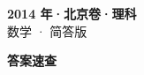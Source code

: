 \documentclass[zihao=-4, a4paper]{ctexart}
\begin{document}
\begin{center}
  {\Large\bfseries 2014 年·北京卷·理科}\\[4pt]
  {\large 数学 · 简答版}
\end{center}
\medskip
{}

\clearpage
{}
\begin{center}{\Large\bfseries 答案速查}\end{center}
\medskip

\end{document}
